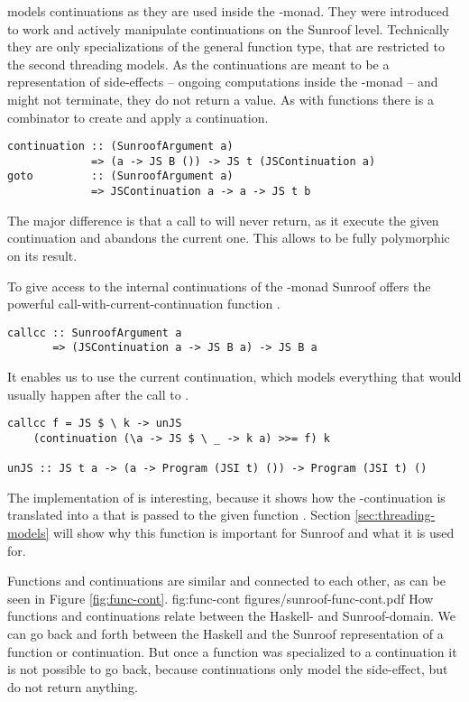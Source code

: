  models continuations as they are used 
inside the \JS-monad. They were introduced to work and actively manipulate 
continuations on the Sunroof level. Technically they are only
specializations of the general function type, that are 
restricted to the second threading models. As the continuations
are meant to be a representation of side-effects -- 
ongoing computations inside the \JS-monad -- and might 
not terminate, they do not return a value. As with functions 
there is a combinator to create and apply a continuation.
\begin{verbatim}
continuation :: (SunroofArgument a) 
             => (a -> JS B ()) -> JS t (JSContinuation a)
goto         :: (SunroofArgument a) 
             => JSContinuation a -> a -> JS t b
\end{verbatim}
The major difference is that a call to  will never
return, as it execute the given continuation and abandons the 
current one. This allows  to be fully polymorphic
on its result. 

To give access to the internal continuations of the \JS-monad
Sunroof offers the powerful call-with-current-continuation 
function  .
\begin{verbatim}
callcc :: SunroofArgument a 
       => (JSContinuation a -> JS B a) -> JS B a
\end{verbatim}
It enables us to use the current continuation, which 
models everything that would usually happen after the call
to . 
\begin{verbatim}
callcc f = JS $ \ k -> unJS 
    (continuation (\a -> JS $ \ _ -> k a) >>= f) k

unJS :: JS t a -> (a -> Program (JSI t) ()) -> Program (JSI t) ()
\end{verbatim}
The implementation of  is interesting,
because it shows how the -continuation is translated 
into a  that is passed to the given function .
Section \ref{sec:threading-models} will show why this function
is important for Sunroof and what it is used for.

Functions and continuations are similar and connected 
to each other, as can be seen in Figure \ref{fig:func-cont}.
\Figure%
{fig:func-cont}%
{figures/sunroof-func-cont.pdf}%
{How functions and continuations relate between the Haskell- and Sunroof-domain.}%
We can go back and forth between the Haskell and the Sunroof
representation of a function or continuation. But once a function
was specialized to a continuation it is not possible to go back,
because continuations only model the side-effect, but do 
not return anything.


